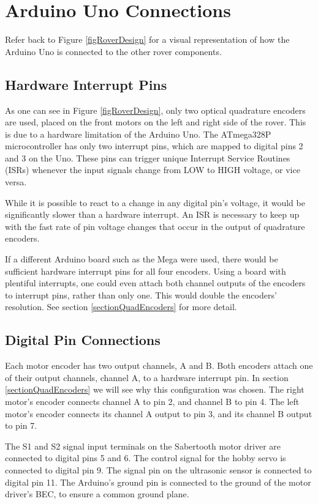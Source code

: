 \section{Arduino Uno Connections}
Refer back to Figure \ref{figRoverDesign} for a visual representation of how the Arduino Uno is connected to the other rover components.

\subsection{Hardware Interrupt Pins} \label{sectionHIP}
As one can see in Figure \ref{figRoverDesign}, only two optical quadrature encoders are used, placed on the front motors on the left and right side of the rover. This is due to a hardware limitation of the Arduino Uno. The ATmega328P microcontroller has only two interrupt pins, which are mapped to digital pins 2 and 3 on the Uno. These pins can trigger unique Interrupt Service Routines (ISRs) whenever the input signals change from LOW to HIGH voltage, or vice versa.

While it is possible to react to a change in any digital pin's voltage, it would be significantly slower than a hardware interrupt. An ISR is necessary to keep up with the fast rate of pin voltage changes that occur in the output of quadrature encoders.

If a different Arduino board such as the Mega were used, there would be sufficient hardware interrupt pins for all four encoders. Using a board with plentiful interrupts, one could even attach both channel outputs of the encoders to interrupt pins, rather than only one. This would double the encoders' resolution. See section \ref{sectionQuadEncoders} for more detail.

\subsection{Digital Pin Connections}
Each motor encoder has two output channels, A and B. Both encoders attach one of their output channels, channel A, to a hardware interrupt pin. In section \ref{sectionQuadEncoders} we will see why this configuration was chosen. The right motor's encoder connects channel A to pin 2, and channel B to pin 4. The left motor's encoder connects its channel A output to pin 3, and its channel B output to pin 7.

The S1 and S2 signal input terminals on the Sabertooth motor driver are connected to digital pins 5 and 6. The control signal for the hobby servo is connected to digital pin 9. The signal pin on the ultrasonic sensor is connected to digital pin 11. The Arduino's ground pin is connected to the ground of the motor driver's BEC, to ensure a common ground plane.

